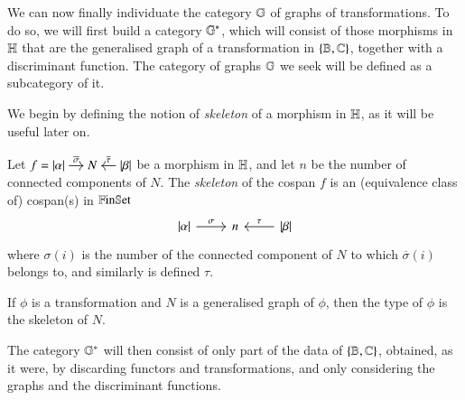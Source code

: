 We can now finally individuate the category $\mathbb G$ of graphs of transformations. To do so, we will first build a category ${\mathbb G}^*$, which will consist of those morphisms in $\mathbb H$ that are the generalised graph of a transformation in $\{ \mathbb B,\mathbb C\}$, together with a discriminant function. The category of graphs $\mathbb G$ we seek will be defined as a subcategory of it. 

We begin by defining the notion of \emph{skeleton} of a morphism in $\mathbb H$, as it will be useful later on.

\begin{definition}
    Let 
    $
    f = \begin{tikzcd}[cramped,sep=small]
    \length\alpha \ar[r,"\overline\sigma"] & N & \ar[l,"\overline\tau"'] \length\beta
    \end{tikzcd}
    $
    be a morphism in $\mathbb H$, and let $n$ be the number of connected components of $N$. The \emph{skeleton} of the cospan $f$ is an (equivalence class of) cospan(s) in $\mathbb{F}\mathrm{in}\mathbb{S}\mathrm{et}$
    \[
    \begin{tikzcd}
    \length\alpha \ar[r,"\sigma"] & n & \length\beta \ar[l,"\tau"']
    \end{tikzcd}
    \]
    where $\sigma(i)$ is the number of the connected component of $N$ to which $\overline\sigma(i)$ belongs to, and similarly is defined $\tau$.
\end{definition}

\begin{remark}
    If $\phi$ is a transformation and $N$ is a generalised graph of $\phi$, then the type of $\phi$ is the skeleton of $N$.
\end{remark}

The category ${\mathbb G}^*$ will then consist of only part of the data of $\{ \mathbb B,\mathbb C\}$, obtained, as it were, by discarding functors and transformations, and only considering the graphs and the discriminant functions.

